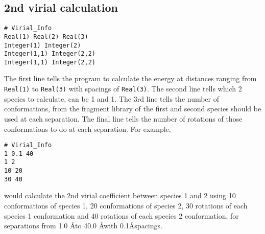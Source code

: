 \documentclass[12pt,twoside]{article}
\begin{document}
\subsection{2nd virial calculation}
\begin{verbatim}
# Virial_Info
Real(1) Real(2) Real(3)
Integer(1) Integer(2) 
Integer(1,1) Integer(2,2)
Integer(1,1) Integer(2,2)
\end{verbatim}
The first line tells the program to calculate the energy at distances ranging from \texttt{Real(1)} to \texttt{Real(3)} with spacings of \texttt{Real(3)}.  The second line tells which 2 species to calculate, can be 1 and 1.  The 3rd line tells the number of conformations, from the fragment library of the first and second species should be used at each separation. The final line tells the number of rotations of those conformations to do at each separation.
\newline\noindent For example,
\begin{verbatim}
# Virial_Info
1 0.1 40
1 2
10 20
30 40
\end{verbatim}
would calculate the 2nd virial coefficient between species 1 and 2 using 10 conformations of species 1, 20 conformations of species 2, 30 rotations of each species 1 conformation and 40 rotations of each species 2 conformation, for separations from 1.0 \AA to 40.0 \AA with 0.1\AA spacings.



\end{document}
